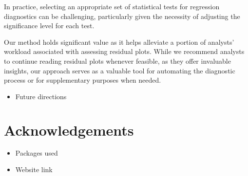 \documentclass[]{interact}
\theoremstyle{plain}%
\theoremstyle{definition}
\theoremstyle{remark}
\providecommand{\tightlist}{%
  \setlength{\itemsep}{0pt}\setlength{\parskip}{0pt}}
\def\tightlist{}
\begin{document}
In practice, selecting an appropriate set of statistical tests for
regression diagnostics can be challenging, particularly given the
necessity of adjusting the significance level for each test.

Our method holds significant value as it helps alleviate a portion of
analysts' workload associated with assessing residual plots. While we
recommend analysts to continue reading residual plots whenever feasible,
as they offer invaluable insights, our approach serves as a valuable
tool for automating the diagnostic process or for supplementary purposes
when needed.

\begin{itemize}
\tightlist
\item
  Future directions
\end{itemize}

\section*{Acknowledgements}\label{acknowledgements}

\begin{itemize}
\tightlist
\item
  Packages used
\item
  Website link
\end{itemize}



\end{document}

